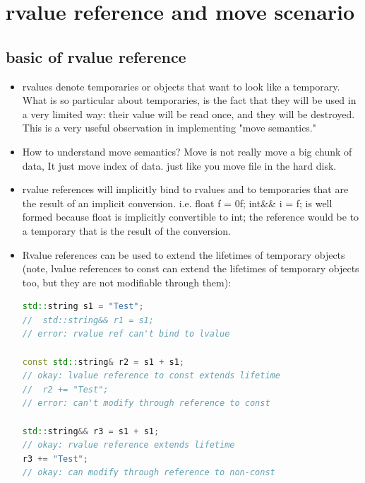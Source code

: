 \documentclass[a4paper,11pt,twoside]{book}
\begin{document}
\section{rvalue reference and move scenario}
\subsection{basic of rvalue reference}
\begin{itemize}

	\item rvalues denote temporaries or objects that want to look like a temporary. What is so particular about temporaries, is the fact that they will be used in a very limited way: their value will be read once, and they will be destroyed. This is a very useful observation in implementing "move semantics." 

	\item How to understand move semantics? Move is not really move a big chunk of data, It just move index of data. just like you move file in the hard disk. 

	\item rvalue references will implicitly bind to rvalues and to temporaries that are the result of an implicit conversion. i.e. float f = 0f; int\&\& i = f; is well formed because float is implicitly convertible to int; the reference would be to a temporary that is the result of the conversion.

	\item Rvalue references can be used to extend the lifetimes of temporary objects (note, lvalue references to const can extend the lifetimes of temporary objects too, but they are not modifiable through them):

\begin{lstlisting}[frame=single, language=c++, mathescape=true]
std::string s1 = "Test";
//  std::string&& r1 = s1;           
// error: rvalue ref can't bind to lvalue

const std::string& r2 = s1 + s1; 
// okay: lvalue reference to const extends lifetime
//  r2 += "Test";                    
// error: can't modify through reference to const

std::string&& r3 = s1 + s1;      
// okay: rvalue reference extends lifetime
r3 += "Test";                    
// okay: can modify through reference to non-const
\end{lstlisting}

\end{itemize}
\end{document}
